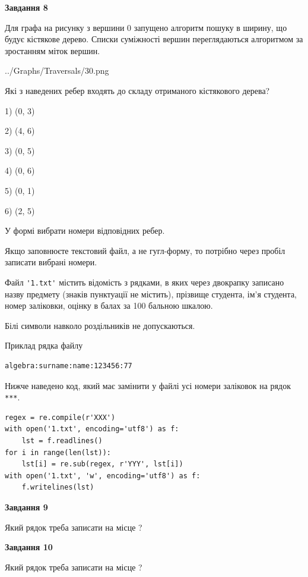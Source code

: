 \documentclass[12pt, ukrainian]{article}
\def\code#1{\Verb!#1!}
\begin{document}
{\begin {large}
{\begin {center}\textbf{Завдання 8}\end {center}}\par
Для графа на рисунку з вершини 0 запущено алгоритм пошуку в ширину, що будує кістякове дерево. Списки суміжності вершин переглядаються алгоритмом за зростанням міток вершин.\par
\begin{center}
	{../Graphs/Traversals/30.png}
\end{center}
\par Які з наведених ребер входять до складу отриманого кістякового дерева?\par
1) (0, 3)\par
2) (4, 6)\par
3) (0, 5)\par
4) (0, 6)\par
5) (0, 1)\par
6) (2, 5)\par
{\vskip 15pt} У формі вибрати номери відповідних ребер.


Якщо заповнюєте текстовий файл, а не гугл-форму, то потрібно через пробіл записа\-ти вибрані номери.\par
\newpage


Файл \code{'1.txt'} містить відомість з рядками, в яких через двокрапку записа\-но назву предмету (знаків пунктуації не містить), прізвище студента, ім'я студента, номер залі\-ков\-ки, оцінку в балах за 100 бальною шкалою.

Білі символи навколо роздільників не допускаються.

Приклад рядка файлу



\begin{verbatim}
algebra:surname:name:123456:77
\end{verbatim}


Нижче наведено код, який має замінити у файлі усі номери заліковок на рядок \code{***}.



\begin{verbatim}
regex = re.compile(r'XXX')
with open('1.txt', encoding='utf8') as f:
    lst = f.readlines()
for i in range(len(lst)):
    lst[i] = re.sub(regex, r'YYY', lst[i])
with open('1.txt', 'w', encoding='utf8') as f:
    f.writelines(lst)
\end{verbatim}




{\begin {center}\textbf{Завдання 9}\end {center}}\par
Який рядок треба записати на місце  ?\par
\vspace{5mm}


{\begin {center}\textbf{Завдання 10}\end {center}}\par
Який рядок треба записати на місце  ?\par


\newpage


\end {large}}
\end{document}
